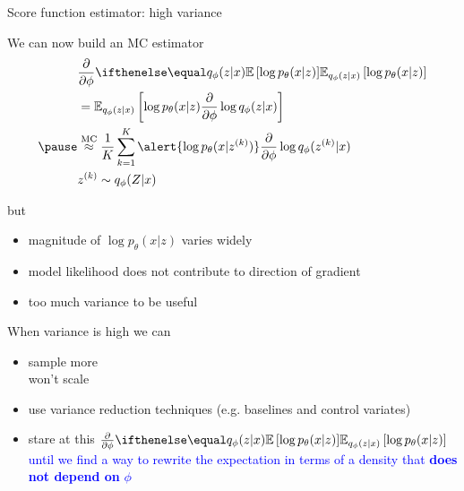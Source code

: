 \begin{frame}[plain]{Score function estimator: high variance}


We can now build an MC estimator
\begin{equation*}
\begin{aligned}
&\pdv{\phi}\E[q_\phi(z|x)]{\log p_\theta(x|z)} \\ 
&= \mathbb E_{q_\phi(z|x)} \left[  \log p_\theta(x|z)  \pdv{\phi}\log q_\phi(z|x)\right] \\ \pause 
&\overset{\text{MC}}{\approx} \frac{1}{K} \sum_{k=1}^K \alert{\log p_\theta(x|z^{(k)})} \pdv{\phi}\log q_\phi(z^{(k)}|x) \\
&z^{(k)} \sim q_\phi(Z|x)
\end{aligned}
\end{equation*}

\pause
but
\begin{itemize}
	\item magnitude of $\log p_\theta(x|z)$ varies widely \pause 
	\item model likelihood does not contribute to direction of gradient \pause
	\item too much variance to be useful
\end{itemize}

\end{frame}

\begin{frame}{When variance is high we can}

\begin{itemize}
	\item sample more \\ \pause
	\alert{won't scale} \pause
	\item use variance reduction techniques (e.g. baselines and control variates)\\ \pause 		
	\item stare at this $\pdv{\phi}\E[q_\phi(z|x)]{\log p_\theta(x|z)}$ \\ \pause
	\textcolor{blue}{until we find a way to rewrite the expectation in terms of a density that 
	{\bf does not depend on} $\phi$}
\end{itemize}
\end{frame}

